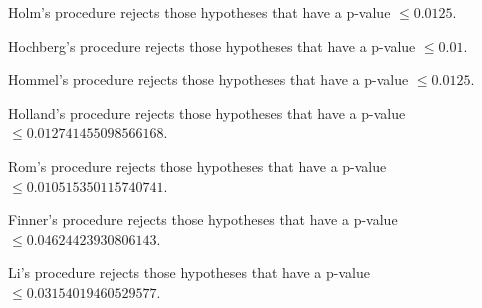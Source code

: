 \documentclass[a4paper,10pt]{article}
\begin{document}
\begin{landscape}
Holm's procedure rejects those hypotheses that have a p-value $\le0.0125$.


Hochberg's procedure rejects those hypotheses that have a p-value $\le0.01$.


Hommel's procedure rejects those hypotheses that have a p-value $\le0.0125$.


Holland's procedure rejects those hypotheses that have a p-value $\le0.012741455098566168$.


Rom's procedure rejects those hypotheses that have a p-value $\le0.010515350115740741$.


Finner's procedure rejects those hypotheses that have a p-value $\le0.04624423930806143$.


Li's procedure rejects those hypotheses that have a p-value $\le0.03154019460529577$.



\newpage


\end{landscape}
\end{document}
